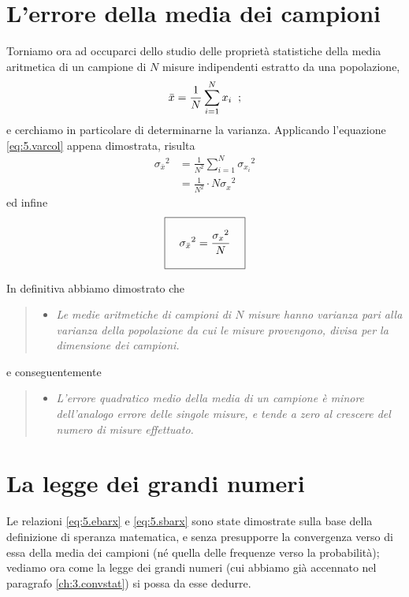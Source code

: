 \section{L'errore della media dei campioni}%
Torniamo ora ad occuparci dello studio delle propriet\`a
statistiche della media aritmetica di un campione di $N$
misure indipendenti estratto da una popolazione,
\begin{equation*}
  \bar x = \frac{1}{N} \sum_{i=1}^{N} x_{i} \;\; ;
\end{equation*}
e cerchiamo in particolare di determinarne la varianza.
Applicando l'equazione \eqref{eq:5.varcol} appena
dimostrata, risulta
\begin{align*}
  {\sigma_{\bar x}}^2 &= \frac{1}{N^2}
     \sum_{i=1}^N {\sigma_{x_i}}^2 \\[1ex]
  &= \frac{1}{N^{2}} \cdot N {\sigma_x}^2
\end{align*}
ed infine
\begin{equation} \label{eq:5.sbarx}
  \boxed{ \rule[-6mm]{0mm}{14mm} \quad
    {\sigma_{\bar x}}^2 = \frac{ {\sigma_x}^2 }{N}
    \quad }
\end{equation}

In definitiva abbiamo dimostrato che
\begin{quote}
  \begin{itemize}
  \item \textit{Le medie aritmetiche di campioni di $N$
      misure hanno varianza pari alla varianza della
      popolazione da cui le misure provengono, divisa per la
      dimensione dei campioni.}
  \end{itemize}
\end{quote}
e conseguentemente
\begin{quote}
  \begin{itemize}
  \item \textit{L'errore quadratico medio della media di un
      campione \`e minore dell'analogo errore delle singole
      misure, e tende a zero al crescere del numero di
      misure effettuato.}
  \end{itemize}
\end{quote}%

\section{La legge dei grandi numeri}%
%
\label{ch:5.granum}
Le relazioni \eqref{eq:5.ebarx} e \eqref{eq:5.sbarx} sono
state dimostrate sulla base della definizione di speranza
matematica, e senza presupporre la convergenza verso di essa
della media dei campioni (n\'e quella delle frequenze verso
la probabilit\`a); vediamo ora come la legge dei grandi
numeri (cui abbiamo gi\`a accennato nel paragrafo
\ref{ch:3.convstat}) si possa da esse dedurre.

